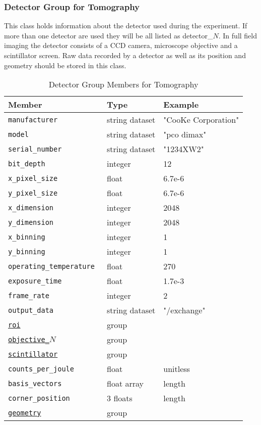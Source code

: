 \subsubsection{Detector Group for Tomography}
\label{table:tomo:detector}

This class holds information about the detector used during the experiment. If  more than one detector are used they will be all listed as detector\_$N$. In full field imaging the detector consists of a CCD camera, microscope objective and a scintillator screen. Raw data recorded by a detector as well as its position and geometry should be stored in this class. 


\begin{table}[h!]\sffamily \footnotesize
\caption{Detector Group Members for Tomography}
\centering
{}
\begin{tabular}{l l l}
\toprule
\bfseries Member     & \bfseries Type & \bfseries Example \\
\midrule
\tt{manufacturer} & string dataset & "CooKe Corporation" \\   
\tt{model} & string dataset &  "pco dimax" \\
\tt{serial\_number} & string dataset &  "1234XW2" \\  
\tt{bit\_depth} & integer & 12 \\     
\tt{x\_pixel\_size} & float & 6.7e-6 \\
\tt{y\_pixel\_size} & float & 6.7e-6 \\
\tt{x\_dimension} & integer & 2048 \\
\tt{y\_dimension} & integer & 2048 \\
\tt{x\_binning} & integer & 1 \\
\tt{y\_binning} & integer & 1 \\
\tt{operating\_temperature} & float &  270 \\     
\tt{exposure\_time} & float & 1.7e-3 \\   
\tt{frame\_rate} & integer &  2 \\
\tt{output\_data} & string dataset & "/exchange" \\
\hyperref[table:roi]{\tt{roi}} & group & \\
\hyperref[table:objective]{\tt{objective\_$N$}} & group & \\
\hyperref[table:scintillator]{\tt{scintillator}} & group &\\
\tt{counts\_per\_joule} & float & unitless \\ 
\tt{basis\_vectors} & float array & length \\ 
\tt{corner\_position} & 3 floats & length \\
\hyperref[tomo:geometry]{\tt{geometry}} & group & \\
\bottomrule
\end{tabular}
\end{table}

